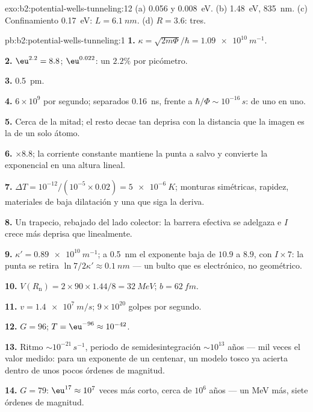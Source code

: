 \begin{solution}{exo:b2:potential-wells-tunneling:12}
(a) \qty{0.056}{} y \qty{0.008}{eV}. (b) \qty{1.48}{eV}, \qty{835}{nm}. (c) Confinamiento
\qty{0.17}{eV}: $L = \qty{6.1}{nm}$. (d) $R = 3.6$: tres.
\end{solution}

\begin{solution}{pb:b2:potential-wells-tunneling:1}
\textbf{1.} $\kappa = \sqrt{2m\Phi}/\hbar = \qty{1.09e10}{m^{-1}}$.

\textbf{2.} $\eu^{2.2} = 8.8$; $\eu^{0.022}$: un $2.2\%$ por picómetro.

\textbf{3.} \qty{0.5}{pm}.

\textbf{4.} $6 \times 10^9$ por segundo; separados \qty{0.16}{ns}, frente a $\hbar/\Phi
\sim 10^{-16}\,\unit{s}$: de uno en uno.

\textbf{5.} Cerca de la mitad; el resto decae tan deprisa con la distancia que la
imagen es la de un solo átomo.

\textbf{6.} $\times 8.8$; la corriente constante mantiene la punta a salvo y convierte
la exponencial en una altura lineal.

\textbf{7.} $\Delta T = 10^{-12}/(10^{-5} \times 0.02) = \qty{5e-6}{K}$; monturas
simétricas, rapidez, materiales de baja dilatación y una  que siga la
deriva.

\textbf{8.} Un trapecio, rebajado del lado colector: la barrera efectiva
se adelgaza e $I$ crece más deprisa que linealmente.

\textbf{9.} $\kappa' = \qty{0.89e10}{m^{-1}}$; a \qty{0.5}{nm} el exponente baja de
$10.9$ a $8.9$, con $I \times 7$: la punta se retira $\ln 7/2\kappa' \approx \qty{0.1}{nm}$
--- un bulto que es electrónico, no geométrico.

\textbf{10.} $V(R_{\text{n}}) = 2 \times 90 \times 1.44/8 = \qty{32}{MeV}$; $b = \qty{62}{fm}$.

\textbf{11.} $v = \qty{1.4e7}{m/s}$; $9 \times 10^{20}$ golpes por segundo.

\textbf{12.} $G = 96$; $T = \eu^{-96} \approx 10^{-42}$.

\textbf{13.} Ritmo $\sim 10^{-21}\,\unit{s^{-1}}$, periodo de semidesintegración $\sim 10^{13}$ años --- mil
veces el valor medido: para un exponente de un centenar, un modelo
tosco ya acierta dentro de unos pocos órdenes de magnitud.

\textbf{14.} $G = 79$: $\eu^{17} \approx 10^7$ veces más corto, cerca de $10^6$ años ---
un MeV más, siete órdenes de magnitud.


\end{solution}
